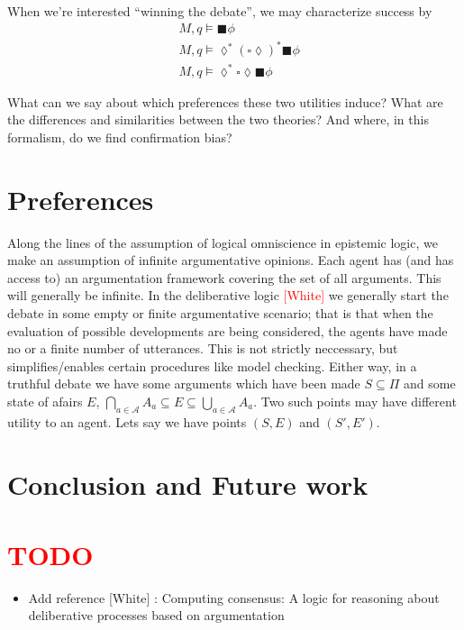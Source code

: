\documentclass{article}
\newcommand{\todo}[1]{\textcolor{red}{#1}}
\newcommand{\bbox}{\blacksquare}
\newcommand{\dbox}{\square}
\newcommand{\ddia}{\lozenge}
\newcommand{\agents}{\mathcal A}
\begin{document}
When we're interested ``winning the debate'', we may characterize success by
\begin{align}
& M, q \models \bbox \phi \\
& M, q \models \ddia^*(\dbox\ddia)^* \bbox \phi \\
& M, q \models \ddia^* \dbox\ddia \bbox \phi
\end{align}

What can we say about which preferences these two utilities induce? What are the differences and similarities between the two theories? And where, in this formalism, do we find confirmation bias? 

\section{Preferences}
Along the lines of the assumption of logical omniscience in epistemic logic, we make an assumption of infinite argumentative opinions. Each agent has (and has access to) an argumentation framework covering the set of all arguments. This will generally be infinite. In the deliberative logic \todo{[White]} we generally start the debate in some empty or finite argumentative scenario; that is that when the evaluation of possible developments are being considered, the agents have made no or a finite number of utterances. This is not strictly neccessary, but simplifies/enables certain procedures like model checking. Either way, in a truthful debate we have some arguments which have been made $S \subseteq \Pi$ and some state of afairs $E$, $\bigcap_{a \in \agents} A_a \subseteq E \subseteq \bigcup_{a \in \agents} A_a$. Two such points may have different utility to an agent. Lets say we have points $(S, E)$ and $(S', E')$.

\section{Conclusion and Future work}

\section{\todo{TODO}}
\begin{itemize}
\item Add reference [White] : Computing consensus: A logic for reasoning about deliberative processes based on argumentation
\end{itemize}



\end{document}

